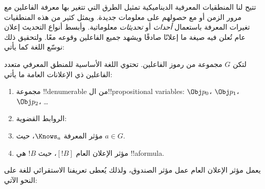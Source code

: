 \documentclass[../../../include/open-logic-section]{subfiles}
\begin{document}


تتيح لنا المنطقيات المعرفية الديناميكية تمثيل الطرق التي تتغير بها
معرفة الفاعلين مع مرور الزمن أو مع حصولهم على معلومات جديدة. ويمثل
كثير من هذه المنطقيات تغيرات المعرفة باستعمال \emph{أحداث} أو
\emph{تحديثات} معلوماتية. وأبسط أنواع التحديث إعلان عام تُعلن فيه صيغة
ما إعلانًا صادقًا ويشهد جميع الفاعلين وقوعه معًا. ولتحقيق ذلك نوسّع
اللغة كما يأتي:

\begin{defn}
لتكن $G$ مجموعة من رموز الفاعلين. تحتوي اللغة الأساسية للمنطق المعرفي
متعدد الفاعلين ذي الإعلانات العامة ما يأتي:
\begin{enumerate}
  \item مجموعة !!{denumerable} من ال!!{propositional variable}s:
    $\Obj p_0$، $\Obj p_1$، $\Obj p_2$، \dots
  \item الروابط القضوية: \startycommalist
  \item مؤثر المعرفة $\Knows_a$، حيث $a \in G$.
  \item مؤثر الإعلان العام $[!B]$، حيث $!B$ هي !!a{formula}.
\end{enumerate}
\end{defn}

يعمل مؤثر الإعلان العام عمل مؤثر الصندوق، ولذلك يُعطى تعريفنا
الاستقرائي للغة على النحو الآتي:
\end{document}
